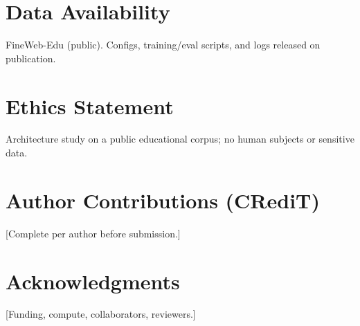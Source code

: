 \documentclass[11pt]{article}
\begin{document}
\section*{Data Availability}
FineWeb-Edu (public). Configs, training/eval scripts, and logs released on publication.

\section*{Ethics Statement}
Architecture study on a public educational corpus; no human subjects or sensitive data.

\section*{Author Contributions (CRediT)}
[Complete per author before submission.]

\section*{Acknowledgments}
[Funding, compute, collaborators, reviewers.]


\end{document}
